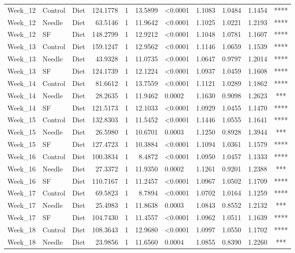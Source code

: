 \documentclass[
  12pt,
  letterpaper,
]{article}
\begin{document}
\begin{longtable}{lllrrrlrrrc}
Week\_12 & Control & Diet & 124.1778 & 1 & 13.5899 & <0.0001 & 1.1083 & 1.0484 & 1.1454 & **** \\ 
Week\_12 & Needle & Diet & 63.5146 & 1 & 11.9642 & <0.0001 & 1.1025 & 1.0221 & 1.2193 & **** \\ 
Week\_12 & SF & Diet & 148.2799 & 1 & 12.9212 & <0.0001 & 1.1048 & 1.0781 & 1.1607 & **** \\ 
Week\_13 & Control & Diet & 159.1247 & 1 & 12.9562 & <0.0001 & 1.1146 & 1.0659 & 1.1539 & **** \\ 
Week\_13 & Needle & Diet & 43.9328 & 1 & 11.0735 & <0.0001 & 1.0647 & 0.9797 & 1.2014 & **** \\ 
Week\_13 & SF & Diet & 124.1739 & 1 & 12.1224 & <0.0001 & 1.0937 & 1.0459 & 1.1608 & **** \\ 
Week\_14 & Control & Diet & 81.6612 & 1 & 13.7559 & <0.0001 & 1.1121 & 1.0289 & 1.1862 & **** \\ 
Week\_14 & Needle & Diet & 28.2635 & 1 & 11.9462 & 0.0002 & 1.1630 & 0.9098 & 1.2623 & *** \\ 
Week\_14 & SF & Diet & 121.5173 & 1 & 12.1033 & <0.0001 & 1.0929 & 1.0455 & 1.1470 & **** \\ 
Week\_15 & Control & Diet & 132.8303 & 1 & 11.5452 & <0.0001 & 1.1446 & 1.0555 & 1.1641 & **** \\ 
Week\_15 & Needle & Diet & 26.5980 & 1 & 10.6701 & 0.0003 & 1.1250 & 0.8928 & 1.3944 & *** \\ 
Week\_15 & SF & Diet & 127.4723 & 1 & 10.3884 & <0.0001 & 1.1094 & 1.0361 & 1.1579 & **** \\ 
Week\_16 & Control & Diet & 100.3834 & 1 & 8.4872 & <0.0001 & 1.0950 & 1.0457 & 1.1333 & **** \\ 
Week\_16 & Needle & Diet & 27.3372 & 1 & 11.9350 & 0.0002 & 1.1261 & 0.9201 & 1.2388 & *** \\ 
Week\_16 & SF & Diet & 110.7167 & 1 & 11.2457 & <0.0001 & 1.0967 & 1.0502 & 1.1709 & **** \\ 
Week\_17 & Control & Diet & 69.5823 & 1 & 8.7894 & <0.0001 & 1.0702 & 1.0164 & 1.1259 & **** \\ 
Week\_17 & Needle & Diet & 25.4983 & 1 & 11.8638 & 0.0003 & 1.0843 & 0.8552 & 1.2132 & *** \\ 
Week\_17 & SF & Diet & 104.7430 & 1 & 11.4557 & <0.0001 & 1.0962 & 1.0511 & 1.1639 & **** \\ 
Week\_18 & Control & Diet & 108.3643 & 1 & 12.9680 & <0.0001 & 1.0997 & 1.0550 & 1.1702 & **** \\ 
Week\_18 & Needle & Diet & 23.9856 & 1 & 11.6560 & 0.0004 & 1.0855 & 0.8390 & 1.2260 & *** \\ 

\end{longtable}
\end{document}
